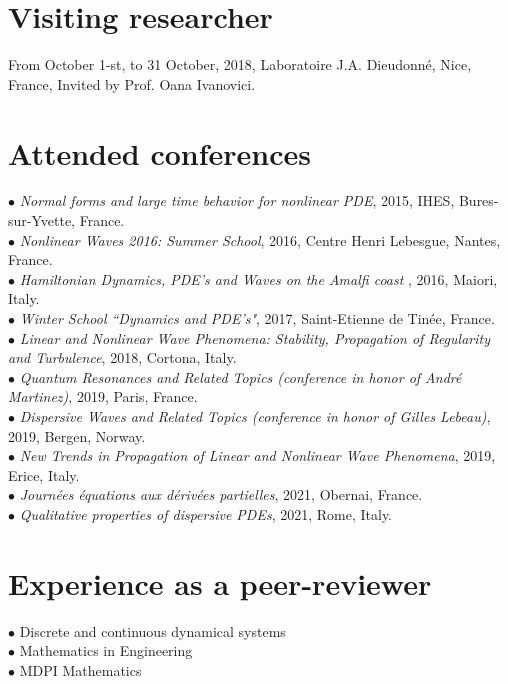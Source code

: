 \documentclass[margin,line,pifont,palatino,courier]{res}
\begin{document}
\begin{resume}
\section{\sc Visiting researcher}

From October 1-st, to 31 October, 2018, Laboratoire  J.A. Dieudonn\'e, Nice, France,  Invited by Prof. Oana Ivanovici.

\section{\sc Attended conferences \\}
 $\bullet$ \emph{Normal forms and large time behavior for nonlinear PDE}, 2015, IHES, Bures-sur-Yvette, France.  \\
 $\bullet$  \emph{Nonlinear Waves 2016: Summer School}, 2016, Centre Henri Lebesgue, Nantes, France.  \\
$\bullet$ \emph{Hamiltonian Dynamics, PDE's and Waves on the Amalfi coast
}, 2016, Maiori, Italy. \\
$\bullet$ \emph{Winter School ``Dynamics and PDE's"}, 2017, Saint-Etienne de Tin\'ee, France. \\
$\bullet$ \emph{Linear and Nonlinear Wave Phenomena: Stability, Propagation of Regularity and Turbulence}, 2018, Cortona, Italy.\\
$\bullet$ \emph{Quantum Resonances and Related Topics (conference in honor of Andr\'e Martinez)}, 2019, Paris, France. \\
$\bullet$ \emph{Dispersive Waves and Related Topics (conference in honor of Gilles Lebeau)}, 2019, Bergen, Norway.\\
$\bullet$ \emph{New Trends in Propagation of Linear and Nonlinear Wave Phenomena}, 2019, Erice, Italy. \\
$\bullet$ \emph{Journ\'ees \'equations aux d\'eriv\'ees partielles}, 2021, Obernai, France.\\
$\bullet$ \emph{Qualitative properties of dispersive PDEs}, 2021, Rome, Italy.\\

\section{\sc Experience as a peer-reviewer} 
$\bullet$ Discrete and continuous dynamical systems\\
$\bullet$ Mathematics in Engineering\\ 
$\bullet$ MDPI Mathematics\\


\end{resume}
\end{document}
